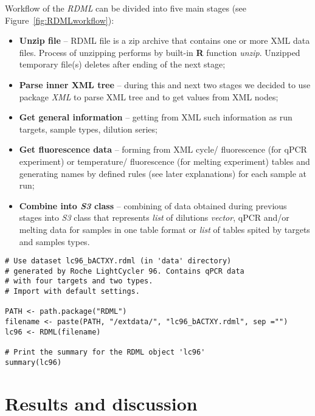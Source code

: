 \documentclass{bioinfo}
\begin{document}
Workflow of the \textit{RDML} can be divided into five main stages (see Figure~\ref{fig:RDMLworkflow}):
\begin{itemize}
	\item \textbf{Unzip file} -- RDML file is a zip archive that contains one or more XML data files. Process of unzipping performs by built-in \textbf{R} function \textit{unzip}. Unzipped temporary file(s) deletes after ending of the next stage;
	\item \textbf{Parse inner XML tree} -- during this and next two stages we decided to use package \textit{XML} to parse XML tree and to get values from XML nodes;
	\item \textbf{Get general information} -- getting from XML such information as run targets, sample types, dilution series;
	\item \textbf{Get fluorescence data} -- forming from XML cycle/ fluorescence (for qPCR experiment) or temperature/ fluorescence (for melting experiment) tables and generating names by defined rules (see later explanations) for each sample at run;
	\item \textbf{Combine into \textit{S3} class} -- combining of data obtained during previous stages into \textit{S3} class that represents \textit{list} of dilutions \textit{vector}, qPCR and/or melting data for samples in one table format or \textit{list} of tables spited by targets and samples types.
\end{itemize}

\begin{figure*}
	\caption[]{\textit{RDML} workflow representation.}
	\label{fig:RDMLworkflow}
\end{figure*}

\begin{figure*}
\begin{verbatim}
# Use dataset lc96_bACTXY.rdml (in 'data' directory)
# generated by Roche LightCycler 96. Contains qPCR data
# with four targets and two types.
# Import with default settings.

PATH <- path.package("RDML")
filename <- paste(PATH, "/extdata/", "lc96_bACTXY.rdml", sep ="")
lc96 <- RDML(filename)

# Print the summary for the RDML object 'lc96'
summary(lc96)
\end{verbatim}
\end{figure*}


\section{Results and discussion}

%
%
%
%
%
%

%

\end{document}
